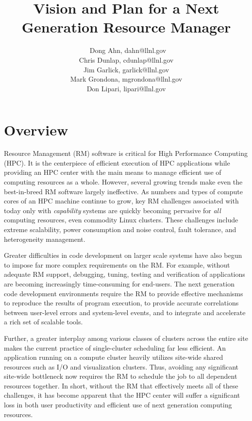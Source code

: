 \documentclass{article}
\newcommand{\ngrmfull}{Next Generation Resource Manager}
\begin{document}
\title{Vision and Plan for a \ngrmfull}
\author{\
Dong Ahn, dahn@llnl.gov\\
Chris Dunlap, cdunlap@llnl.gov\\
Jim Garlick, garlick@llnl.gov\\
Mark Grondona, mgrondona@llnl.gov\\
Don Lipari, lipari@llnl.gov}


\maketitle

\section{Overview}

Resource Management (RM) software is critical for High Performance Computing
(HPC). It is the centerpiece of efficient execution of HPC applications
while providing an HPC center with the main means to manage efficient use
of computing resources as a whole.  However, several growing trends make
even the best-in-breed RM software largely ineffective.  As numbers and
types of compute cores of an HPC machine continue to grow, key RM challenges
associated with today only with {\em capability} systems are quickly
becoming pervasive for {\em all} computing resources, even commodity
Linux clusters.  These challenges include extreme scalability, power
consumption and noise control, fault tolerance, and heterogeneity management.

Greater difficulties in code development on larger scale systems have
also begun to impose far more complex requirements on the RM.  For example,
without adequate RM support, debugging, tuning, testing and verification
of applications are becoming increasingly time-consuming for end-users.
The next generation code development environments require the RM to provide
effective mechanisms to reproduce the results of program execution, to
provide accurate correlations between user-level errors and system-level
events, and to integrate and accelerate a rich set of scalable tools.

Further, a greater interplay among various classes of clusters across
the entire site makes the current practice of single-cluster scheduling
far less efficient.  An application running on a compute cluster heavily
utilizes site-wide shared resources such as I/O and visualization clusters.
Thus, avoiding any significant site-wide bottleneck now requires the RM
to schedule the job to all dependent resources together. In short, without
the RM that effectively meets all of these challenges, it has become apparent
that the HPC center will suffer a significant loss in both user productivity
and efficient use of next generation computing resources.
\end{document}
